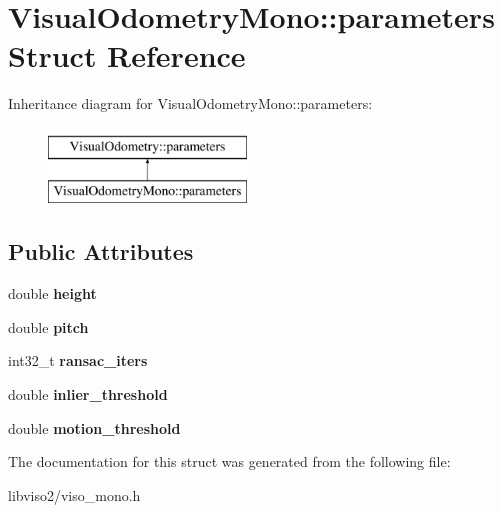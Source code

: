 \hypertarget{struct_visual_odometry_mono_1_1parameters}{\section{Visual\+Odometry\+Mono\+:\+:parameters Struct Reference}
\label{struct_visual_odometry_mono_1_1parameters}
}
Inheritance diagram for Visual\+Odometry\+Mono\+:\+:parameters\+:\begin{figure}[H]
\begin{center}
\leavevmode
\includegraphics[height=2.000000cm]{struct_visual_odometry_mono_1_1parameters}
\end{center}
\end{figure}
\subsection*{Public Attributes}
\begin{DoxyCompactItemize}
\item 
\hypertarget{struct_visual_odometry_mono_1_1parameters_a9ef9008e32754fa03aaf29843879830b}{double {\bfseries height}}\label{struct_visual_odometry_mono_1_1parameters_a9ef9008e32754fa03aaf29843879830b}

\item 
\hypertarget{struct_visual_odometry_mono_1_1parameters_a6686713a1434bf1888a68583a4aaac3a}{double {\bfseries pitch}}\label{struct_visual_odometry_mono_1_1parameters_a6686713a1434bf1888a68583a4aaac3a}

\item 
\hypertarget{struct_visual_odometry_mono_1_1parameters_ac1c6895ee3e89c4d1e92d4ac5e5479d8}{int32\+\_\+t {\bfseries ransac\+\_\+iters}}\label{struct_visual_odometry_mono_1_1parameters_ac1c6895ee3e89c4d1e92d4ac5e5479d8}

\item 
\hypertarget{struct_visual_odometry_mono_1_1parameters_ac15db7ddbc967dabbbc724079bbe0a7b}{double {\bfseries inlier\+\_\+threshold}}\label{struct_visual_odometry_mono_1_1parameters_ac15db7ddbc967dabbbc724079bbe0a7b}

\item 
\hypertarget{struct_visual_odometry_mono_1_1parameters_a9a9ba628170a5c2bce117ea81f1c8a00}{double {\bfseries motion\+\_\+threshold}}\label{struct_visual_odometry_mono_1_1parameters_a9a9ba628170a5c2bce117ea81f1c8a00}

\end{DoxyCompactItemize}


The documentation for this struct was generated from the following file\+:\begin{DoxyCompactItemize}
\item 
libviso2/viso\+\_\+mono.\+h\end{DoxyCompactItemize}
